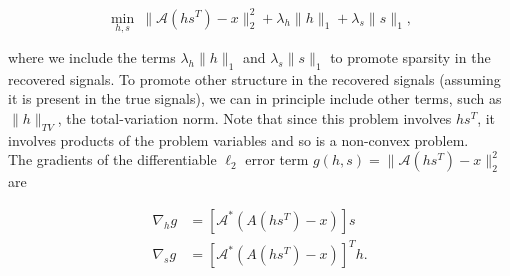\documentclass[journal]{IEEEtran}
\begin{document}
\[ \min_{h,s}~ \|\mathcal{A}(hs^T)-x\|_2^2 + \lambda_h\|h\|_1 + \lambda_s \|s\|_1, \] 

\noindent where we include the terms $\lambda_h\|h\|_1$ and $\lambda_s\|s\|_1$ to promote sparsity in the recovered signals.  To promote other structure in the recovered signals (assuming it is present in the true signals), we can in principle include other terms, such as $\|h\|_{TV}$, the total-variation norm.  Note that since this problem involves $hs^T$, it involves products of the problem variables and so is a non-convex problem.\\

The gradients of the differentiable $\ell_2$ error term $g(h,s)=\|\mathcal{A}(hs^T)-x\|_2^2$ are

\begin{align*}
   \nabla_h g &= \left[\mathcal{A}^\ast\left(A(hs^T) - x\right)\right]s\\
   \nabla_s g &= \left[\mathcal{A}^\ast\left(A(hs^T) - x\right)\right]^Th.
\end{align*}
\end{document}
